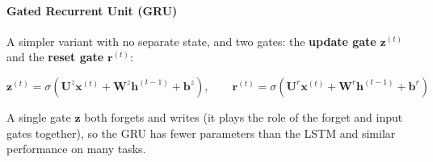 \paragraph{Gated Recurrent Unit (GRU)}
A simpler variant with no separate state, and two gates: the \textbf{update gate}
$\bm{z}^{(t)}$ and the \textbf{reset gate} $\bm{r}^{(t)}$:
\begin{center}
    $\bm{z}^{(t)} = \sigma\left(\bm{U}^{z}\bm{x}^{(t)} + \bm{W}^{z}\bm{h}^{(t-1)} +
    \bm{b}^{z}\right),\qquad
    \bm{r}^{(t)} = \sigma\left(\bm{U}^{r}\bm{x}^{(t)} + \bm{W}^{r}\bm{h}^{(t-1)} +
    \bm{b}^{r}\right)$\\[1ex]
\end{center}
A single gate $\bm{z}$ both forgets and writes (it plays the role of the forget and input
gates together), so the GRU has fewer parameters than the LSTM and similar performance on
many tasks.

